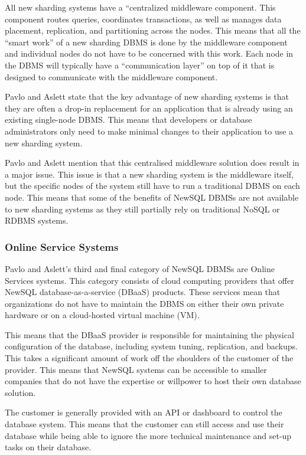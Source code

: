 \documentclass[10pt, conference]{IEEEtran}
\begin{document}
All new sharding systems have a ``centralized middleware component. This component routes queries, coordinates transactions, as well as manages data placement, replication, and partitioning across the nodes. This means that all the ``smart work'' of a new sharding DBMS is done by the middleware component and individual nodes do not have to be concerned with this work. Each node in the DBMS will typically have a ``communication layer'' on top of it that is designed to communicate with the middleware component.

Pavlo and Aslett state that the key advantage of new sharding systems is that they are often a drop-in replacement for an application that is already using an existing single-node DBMS. This  means that developers or database administrators only need to make minimal changes to their application to use a new sharding system.

Pavlo and Aslett mention that this centralised middleware solution does result in a major issue. This issue is that a new sharding system is the middleware itself, but the specific nodes of the system still have to run a traditional DBMS on each node. This means that some of the benefits of NewSQL DBMSs are not available to new sharding systems as they still partially rely on traditional NoSQL or RDBMS systems.

\subsubsection{Online Service Systems}

Pavlo and Aslett's third and final category of NewSQL DBMSs are Online Services systems. This category consists of cloud computing providers that offer NewSQL database-as-a-service (DBaaS) products. These services mean that organizations do not have to maintain the DBMS on either their own private hardware or on a cloud-hosted virtual machine (VM).

This means that the DBaaS provider is responsible for maintaining the physical configuration of the database, including system tuning, replication, and backups. This takes a significant amount of work off the shoulders of the customer of the provider. This means that NewSQL systems can be accessible to smaller companies that do not have the expertise or willpower to host their own database solution.

The customer is generally provided with an API or dashboard to control the database system. This means that the customer can still access and use their database while being able to ignore the more technical maintenance and set-up tasks on their database. 
\end{document}
